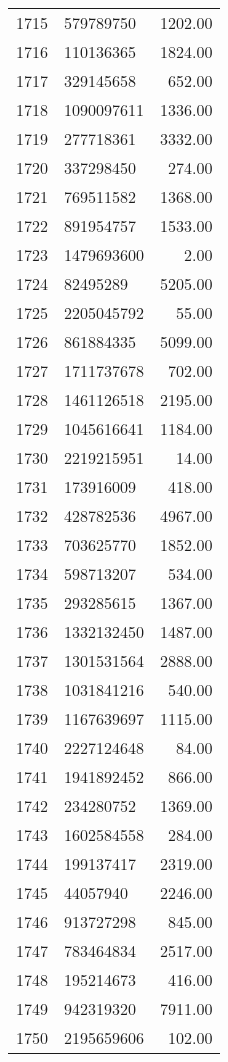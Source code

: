 \begin{table}[ht]
\begin{tabular}{rlr}
  1715 & 579789750 & 1202.00 \\ 
  1716 & 110136365 & 1824.00 \\ 
  1717 & 329145658 & 652.00 \\ 
  1718 & 1090097611 & 1336.00 \\ 
  1719 & 277718361 & 3332.00 \\ 
  1720 & 337298450 & 274.00 \\ 
  1721 & 769511582 & 1368.00 \\ 
  1722 & 891954757 & 1533.00 \\ 
  1723 & 1479693600 & 2.00 \\ 
  1724 & 82495289 & 5205.00 \\ 
  1725 & 2205045792 & 55.00 \\ 
  1726 & 861884335 & 5099.00 \\ 
  1727 & 1711737678 & 702.00 \\ 
  1728 & 1461126518 & 2195.00 \\ 
  1729 & 1045616641 & 1184.00 \\ 
  1730 & 2219215951 & 14.00 \\ 
  1731 & 173916009 & 418.00 \\ 
  1732 & 428782536 & 4967.00 \\ 
  1733 & 703625770 & 1852.00 \\ 
  1734 & 598713207 & 534.00 \\ 
  1735 & 293285615 & 1367.00 \\ 
  1736 & 1332132450 & 1487.00 \\ 
  1737 & 1301531564 & 2888.00 \\ 
  1738 & 1031841216 & 540.00 \\ 
  1739 & 1167639697 & 1115.00 \\ 
  1740 & 2227124648 & 84.00 \\ 
  1741 & 1941892452 & 866.00 \\ 
  1742 & 234280752 & 1369.00 \\ 
  1743 & 1602584558 & 284.00 \\ 
  1744 & 199137417 & 2319.00 \\ 
  1745 & 44057940 & 2246.00 \\ 
  1746 & 913727298 & 845.00 \\ 
  1747 & 783464834 & 2517.00 \\ 
  1748 & 195214673 & 416.00 \\ 
  1749 & 942319320 & 7911.00 \\ 
  1750 & 2195659606 & 102.00 \\ 

\end{tabular}
\end{table}
